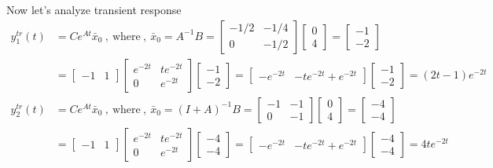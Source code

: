\documentclass[twoside]{article}
\begin{document}
Now let's analyze transient response
\begin{align*} 
y_1^{tr}(t) &= C e^{A t} \bar{x}_0 \ , \ \mathrm{where} \ , \  \bar{x}_0 = A^{-1} B = \begin{bmatrix} -1/2 & -1/4 \\ 0 & -1/2 \end{bmatrix}  \begin{bmatrix} 0 \\ 4 \end{bmatrix} = \begin{bmatrix} -1 \\ -2 \end{bmatrix} 
\\
&= \begin{bmatrix} -1 & 1 \end{bmatrix} \begin{bmatrix} e^{-2 t} & t e^{-2 t} \\ 0 &e^{-2 t} \end{bmatrix} \begin{bmatrix} -1 \\ -2 \end{bmatrix} 
= \begin{bmatrix} -e^{-2 t} & -t e^{-2 t} + e^{-2 t} \end{bmatrix} \begin{bmatrix} -1 \\ -2 \end{bmatrix}  
= (2 t - 1) e^{-2 t} 
\\
y_2^{tr}(t) &= C e^{A t} \bar{x}_0 \ , \ \mathrm{where} \ , \  \bar{x}_0 = (I+A)^{-1} B = \begin{bmatrix} -1 & -1 \\ 0 & -1 \end{bmatrix}  \begin{bmatrix} 0 \\ 4 \end{bmatrix} = \begin{bmatrix} -4 \\ -4 \end{bmatrix} 
\\
&= \begin{bmatrix} -1 & 1 \end{bmatrix} \begin{bmatrix} e^{-2 t} & t e^{-2 t} \\ 0 &e^{-2 t} \end{bmatrix} \begin{bmatrix} -4 \\ -4 \end{bmatrix} 
= \begin{bmatrix} -e^{-2 t} & -t e^{-2 t} + e^{-2 t} \end{bmatrix} \begin{bmatrix} -4 \\ -4 \end{bmatrix}  
= 4 t e^{-2 t} 
\end{align*}
\end{document}
